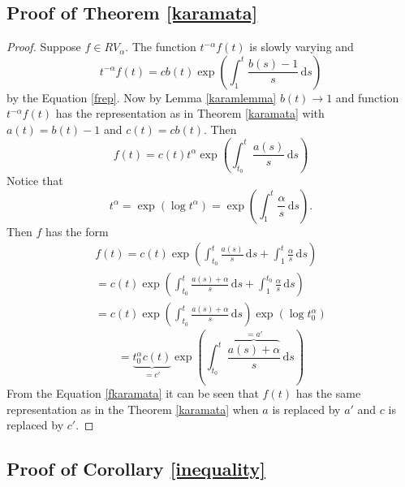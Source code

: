 \documentclass[english,12pt,a4paper,pdftex,sci,utf8]{aaltothesis} %
\begin{document}
\subsection{Proof of Theorem \ref{karamata}}

\begin{proof}
Suppose $f \in RV_{\alpha}$. The function $t^{-\alpha}f(t)$ is slowly varying and
\begin{equation*}
t^{-\alpha}f(t) = cb(t) \exp \left( \int_{1}^{t} \frac{b(s)-1}{s}\,\mathrm{d}s \right)
\end{equation*}
by the Equation \eqref{frep}. Now by Lemma \ref{karamlemma} $b(t) \rightarrow 1$ and function $t^{-\alpha}f(t)$ has the representation as in Theorem \ref{karamata} with $a(t)=b(t)-1$ and $c(t)=cb(t)$. Then
\begin{equation*}
f(t) = c(t)t^{\alpha} \exp \left(  \int_{t_0}^{t} \frac{a(s)}{s}\,\mathrm{d}s  \right)
\end{equation*}
Notice that $$t^{\alpha}=\exp \left( \log t^{\alpha} \right)=\exp \left(  \int_{1}^{t} \frac{\alpha}{s}\,\mathrm{d}s  \right).$$ Then $f$ has the form
\begin{equation*}
\begin{split}
f(t) = c(t) \exp \left(  \int_{t_0}^{t} \frac{a(s)}{s}\,\mathrm{d}s + \int_{1}^{t} \frac{\alpha}{s}\,\mathrm{d}s  \right) \\
= c(t) \exp \left(  \int_{t_0}^{t} \frac{a(s)+\alpha}{s}\,\mathrm{d}s + \int_{1}^{t_0} \frac{\alpha}{s}\,\mathrm{d}s  \right)\\
= c(t) \exp \left(  \int_{t_0}^{t} \frac{a(s)+\alpha}{s}\,\mathrm{d}s \right) \exp \left( \log t_0^{\alpha}  \right)
\end{split}
\end{equation*}
\begin{equation}
= \underbrace{t_0^{\alpha}c(t)}_{=c'} \exp \left(  \int_{t_0}^{t} \frac{\overbrace{a(s)+\alpha}^{=a'}}{s}\,\mathrm{d}s \right)
\label{fkaramata}
\end{equation}
From the Equation \eqref{fkaramata} it can be seen that $f(t)$ has the same representation as in the Theorem \ref{karamata} when $a$ is replaced by $a'$ and $c$ is replaced by $c'$.
\end{proof}

\subsection{Proof of Corollary \ref{inequality}}
\end{document}

